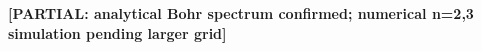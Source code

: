 



%



\textbf{[PARTIAL: analytical Bohr spectrum confirmed; numerical n=2,3 simulation pending larger grid]}
